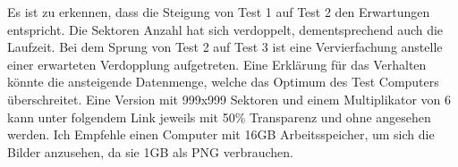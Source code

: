 Es ist zu erkennen, dass die Steigung von Test 1 auf Test 2 den Erwartungen entspricht. Die Sektoren  Anzahl hat sich verdoppelt, dementsprechend auch die Laufzeit. Bei dem Sprung von Test 2 auf Test 3 ist eine Vervierfachung anstelle einer erwarteten Verdopplung aufgetreten. Eine Erklärung für das Verhalten könnte die ansteigende Datenmenge, welche das Optimum des Test Computers überschreitet. Eine Version mit 999x999 Sektoren und einem Multiplikator von 6 kann unter folgendem Link jeweils mit 50\% Transparenz und ohne angesehen werden. Ich Empfehle einen Computer mit 16GB Arbeitsspeicher, um sich die Bilder anzusehen, da sie 1GB als PNG verbrauchen. \url{}